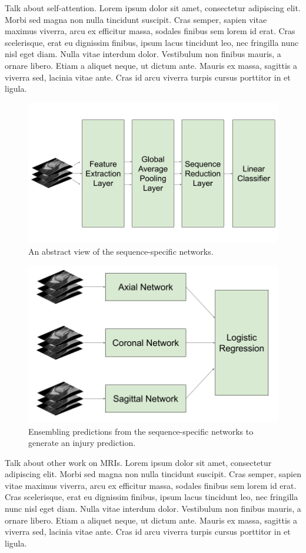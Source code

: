 \documentclass[10pt,twocolumn,letterpaper]{article}
\begin{document}
Talk about self-attention.
Lorem ipsum dolor sit amet, consectetur adipiscing elit. Morbi sed magna non nulla tincidunt suscipit. Cras semper, sapien vitae maximus viverra, arcu ex efficitur massa, sodales finibus sem lorem id erat. Cras scelerisque, erat eu dignissim finibus, ipsum lacus tincidunt leo, nec fringilla nunc nisl eget diam. Nulla vitae interdum dolor. Vestibulum non finibus mauris, a ornare libero. Etiam a aliquet neque, ut dictum ante. Mauris ex massa, sagittis a viverra sed, lacinia vitae ante. Cras id arcu viverra turpis cursus porttitor in et ligula.

\begin{figure}
\begin{center}
\includegraphics[width=0.6\linewidth]{../images/diagram/network.png}
\end{center}
   \caption{An abstract view of the sequence-specific networks.}
\label{fig:network}
\end{figure}

\begin{figure}
\begin{center}
\includegraphics[width=0.6\linewidth]{../images/diagram/ensemble.png}
\end{center}
   \caption{Ensembling predictions from the sequence-specific networks to generate an injury prediction.}
\label{fig:ensemble}
\end{figure}

Talk about other work on MRIs.
Lorem ipsum dolor sit amet, consectetur adipiscing elit. Morbi sed magna non nulla tincidunt suscipit. Cras semper, sapien vitae maximus viverra, arcu ex efficitur massa, sodales finibus sem lorem id erat. Cras scelerisque, erat eu dignissim finibus, ipsum lacus tincidunt leo, nec fringilla nunc nisl eget diam. Nulla vitae interdum dolor. Vestibulum non finibus mauris, a ornare libero. Etiam a aliquet neque, ut dictum ante. Mauris ex massa, sagittis a viverra sed, lacinia vitae ante. Cras id arcu viverra turpis cursus porttitor in et ligula.
\end{document}
